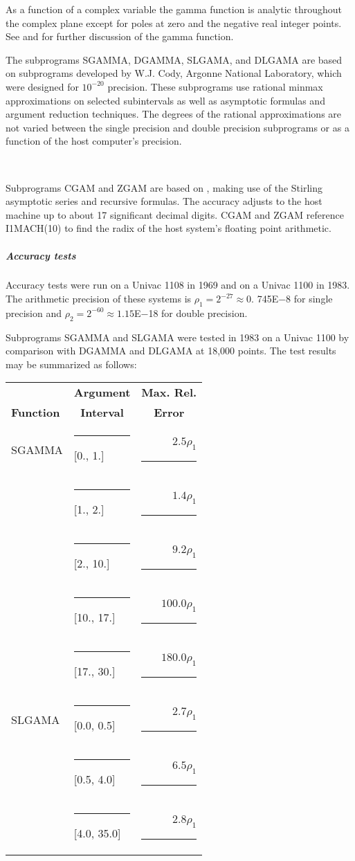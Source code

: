 \documentclass[twoside]{MATH77}
\begin{document}
As a function of a complex variable the gamma function is analytic
throughout the complex plane except for poles at zero and the negative real
integer points. See \cite{ams55} and \cite{Hart:1968:CA:gam} for further
discussion of the gamma function.

The subprograms SGAMMA, DGAMMA, SLGAMA, and DLGAMA are based on subprograms
developed by W.J. Cody, Argonne National Laboratory, which were designed for
$10^{-20}$ precision. These subprograms use rational minmax approximations
on selected subintervals as well as asymptotic formulas and argument
reduction techniques. The degrees of the rational approximations are not
varied between the single precision and double precision subprograms or as
a function of the host computer's precision.
\vspace{10pt}

\hspace{5pt}\mbox{ }

Subprograms CGAM and ZGAM are based on \cite{Kuki:1972:CGF}, making use of
the Stirling asymptotic series and recursive formulas.  The accuracy
adjusts to the host machine up to about 17 significant decimal digits.
CGAM and ZGAM reference I1MACH(10) to find the radix of the host system's
floating point arithmetic.

\subparagraph{Accuracy tests}

Accuracy tests were run on a Univac 1108 in 1969 and on a Univac 1100 in
1983. The arithmetic precision of these systems is $\rho _1 = 2^{-27}
\approx 0.$ 745E$-$8 for single precision and $\rho _2 = 2^{-60}
\approx 1.15$E$-$18 for double precision.

Subprograms SGAMMA and SLGAMA were tested in 1983 on a Univac 1100 by
comparison with DGAMMA and DLGAMA at 18,000 points. The test results may be
summarized as follows:

\begin{center}
\begin{tabular}{l@{}lr}
& \multicolumn{1}{c}{\bf Argument} & \multicolumn{1}{c}{\bf Max. Rel.}\\
\multicolumn{1}{l}{\bf Function} & \multicolumn{1}{c}{\bf Interval} &
\multicolumn{1}{c}{\bf Error}\\
SGAMMA & \rule{.17in}{0pt}[0., 1.] & $2.5\rho _1$\rule{.12in}{0pt}\\
& \rule{.17in}{0pt}[1., 2.] & $1.4\rho _1$\rule{.12in}{0pt}\\
& \rule{.17in}{0pt}[2., 10.] & $9.2\rho _1$\rule{.12in}{0pt}\\
& \rule{.17in}{0pt}[10., 17.] & $100.0\rho _1$\rule{.12in}{0pt}\\
& \rule{.17in}{0pt}[17., 30.] & $180.0\rho _1$\rule{.12in}{0pt}\\
SLGAMA & \rule{.17in}{0pt}[0.0, 0.5] & $2.7\rho _1$\rule{.12in}{0pt}\\
& \rule{.17in}{0pt}[0.5, 4.0] & $6.5\rho _1$\rule{.12in}{0pt}\\
& \rule{.17in}{0pt}[4.0, 35.0] & $2.8\rho _1$\rule{.12in}{0pt}
\end{tabular}
\end{center}
\end{document}
